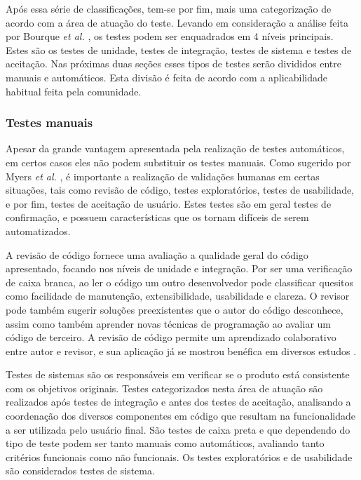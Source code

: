 Após essa série de classificações, tem-se por fim, mais uma categorização de acordo com a área de atuação do teste. Levando em consideração a análise feita por Bourque \emph{et al.} \cite{bourque}, os testes podem ser enquadrados em 4 níveis principais. Estes são os testes de unidade, testes de integração, testes de sistema e testes de aceitação. Nas próximas duas seções esses tipos de testes serão divididos entre manuais e automáticos. Esta divisão é feita de acordo com a aplicabilidade habitual feita pela comunidade.

\hypertarget{testes-manuais}{%
\subsubsection{Testes manuais}\label{testes-manuais}}

Apesar da grande vantagem apresentada pela realização de testes automáticos, em certos casos eles não podem substituir os testes manuais. Como sugerido por Myers \emph{et al.} \cite{myers}, é importante a realização de validações humanas em certas situações, tais como revisão de código, testes exploratórios, testes de usabilidade, e por fim, testes de aceitação de usuário. Estes testes são em geral testes de confirmação, e possuem características que os tornam difíceis de serem automatizados.

A revisão de código fornece uma avaliação a qualidade geral do código apresentado, focando nos níveis de unidade e integração. Por ser uma verificação de caixa branca, ao ler o código um outro desenvolvedor pode classificar quesitos como facilidade de manutenção, extensibilidade, usabilidade e clareza. O revisor pode também sugerir soluções preexistentes que o autor do código desconhece, assim como também aprender novas técnicas de programação ao avaliar um código de terceiro. A revisão de código permite um aprendizado colaborativo entre autor e revisor, e sua aplicação já se mostrou benéfica em diversos estudos \cite{bacchelli}.

Testes de sistemas são os responsáveis em verificar se o produto está consistente com os objetivos originais. Testes categorizados nesta área de atuação são realizados após testes de integração e antes dos testes de aceitação, analisando a coordenação dos diversos componentes em código que resultam na funcionalidade a ser utilizada pelo usuário final. São testes de caixa preta e que dependendo do tipo de teste podem ser tanto manuais como automáticos, avaliando tanto critérios funcionais como não funcionais. Os testes exploratórios e de usabilidade são considerados testes de sistema.

